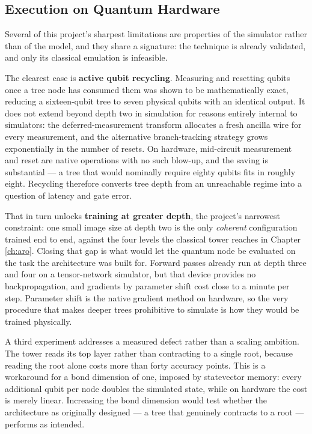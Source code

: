 \documentclass[12pt, a4paper, oneside]{report}
\begin{document}
\subsection{Execution on Quantum Hardware}

Several of this project's sharpest limitations are properties of the simulator
rather than of the model, and they share a signature: the technique is already
validated, and only its classical emulation is infeasible.

The clearest case is \textbf{active qubit recycling}. Measuring and resetting
qubits once a tree node has consumed them was shown to be mathematically exact,
reducing a sixteen-qubit tree to seven physical qubits with an identical output.
It does not extend beyond depth two in simulation for reasons entirely internal
to simulators: the deferred-measurement transform allocates a fresh ancilla wire
for every measurement, and the alternative branch-tracking strategy grows
exponentially in the number of resets. On hardware, mid-circuit measurement and
reset are native operations with no such blow-up, and the saving is
substantial --- a tree that would nominally require eighty qubits fits in
roughly eight. Recycling therefore converts tree depth from an unreachable
regime into a question of latency and gate error.

That in turn unlocks \textbf{training at greater depth}, the project's narrowest
constraint: one small image size at depth two is the only \emph{coherent}
configuration trained end to end, against the four levels the classical tower
reaches in Chapter \ref{ch:aro}. Closing that gap is what would let the quantum
node be evaluated on the task the architecture was built for. Forward passes
already run at depth three and four on a
tensor-network simulator, but that device provides no backpropagation, and
gradients by parameter shift cost close to a minute per step. Parameter shift is
the native gradient method on hardware, so the very procedure that makes deeper
trees prohibitive to simulate is how they would be trained physically.

A third experiment addresses a measured defect rather than a scaling ambition.
The tower reads its top layer rather than contracting to a single root, because
reading the root alone costs more than forty accuracy points. This is a
workaround for a bond dimension of one, imposed by statevector memory: every
additional qubit per node doubles the simulated state, while on hardware the
cost is merely linear. Increasing the bond dimension would test whether the
architecture as originally designed --- a tree that genuinely contracts to a
root --- performs as intended.
\end{document}
